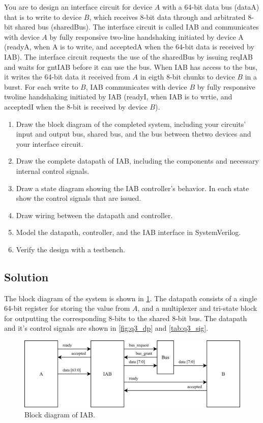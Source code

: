 \documentclass[../main.tex]{subfiles}
\begin{document}
You are to design an interface circuit for device $A$ with a 64-bit data bus (dataA) that is to write to device $B$, which receives 8-bit data through and arbitrated 8-bit shared bus (sharedBus). The interface circuit is called IAB and communicates with device $A$ by fully responsive two-line handshaking initiated by device A (readyA, when A is to write, and acceptedA when the 64-bit data is received by IAB). The interface circuit requests the use of the sharedBus by issuing reqIAB and waits for gntIAB before it can use the bus. When IAB has access to the bus, it writes the 64-bit data it received from $A$ in eigth 8-bit chunks to device $B$ in a burst. For each write to $B$, IAB communicates with device $B$ by fully responsive twoline handshaking initiated by IAB (readyI, when IAB is to wrtie, and acceptedI when the 8-bit is received by device $B$).

\begin{enumerate}
    \item Draw the block diagram of the completed system, including your circuits' input and output bus, shared bus, and the bus between thetwo devices and your interface circuit.
    \item Draw the complete datapath of IAB, including the components and necessary internal control signals.
    \item Draw a state diagram showing the IAB controller's behavior. In each state show the control signals that are issued.
    \item Draw wiring between the datapath and controller.
    \item Model the datapath, controller, and the IAB interface in SystemVerilog.
    \item Verify the design with a testbench.
\end{enumerate}

\subsection*{Solution}

The block diagram of the system is shown in \cref{fig:q3}. The datapath consists of a single 64-bit register for storing the value from $A$, and a multiplexer and tri-state block for outputting the corresponding 8-bits to the shared 8-bit bus. The datapath and it's control signals are shown in \cref{fig:q3_dp} and \cref{tab:q3_sig}.

\begin{figure}[H]
    \centering
    \includegraphics[width=\linewidth]{assets/q3.png}
    \caption{Block diagram of IAB.}
    \label{fig:q3}
\end{figure}
\end{document}
